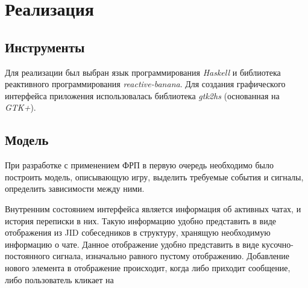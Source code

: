 \section{Реализация}
\subsection{Инструменты}
Для реализации был выбран язык программирования \emph{Haskell} и библиотека реактивного программирования \emph{reactive-banana}.
Для создания графического интерфейса приложения использовалась библиотека \emph{gtk2hs} (основанная на \emph{GTK+}).

\subsection{Модель}
При разработке с применением ФРП в первую очередь необходимо было построить модель, описывающую
игру, выделить требуемые события и сигналы, определить зависимости между ними.

Внутренним состоянием интерфейса является информация об активных чатах, и история переписки в них.
Такую информацию удобно представить в виде отображения из JID собеседников в структуру, хранящую необходимую информацию о чате.
Данное отображение удобно представить в виде кусочно-постоянного сигнала, изначально равного пустому отображению.
Добавление нового элемента в отображение происходит, когда либо приходит сообщение, либо пользователь кликает на 